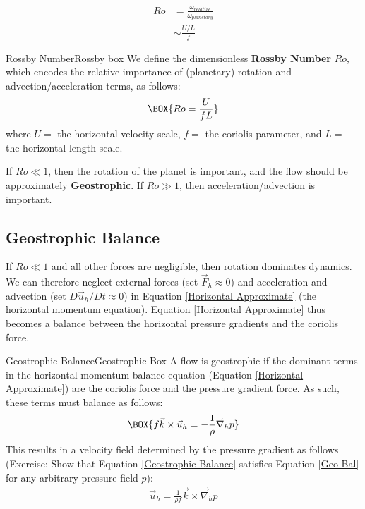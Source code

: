 \begin{align}
    Ro &= \frac{\omega_{relative}}{\omega_{planetary}}\\
    &\sim\frac{U/L}{f}
\end{align}

\begin{fact}{Rossby Number}{Rossby box}\label{Rossby Box}
    We define the dimensionless \textbf{Rossby Number} $Ro$, which encodes the relative importance of (planetary) rotation and advection/acceleration terms, as follows:
    \begin{gather}
        \BOX{
            Ro=\frac{U}{fL}
        }
    \end{gather}
    where $U=$ the horizontal velocity scale, $f=$ the coriolis parameter, and $L=$ the horizontal length scale. 
    
    If $Ro\ll 1$, then the rotation of the planet is important, and the flow should be approximately \textbf{Geostrophic}. If $Ro\gg 1$, then acceleration/advection is important.
\end{fact}

\subsection{Geostrophic Balance}

If $Ro\ll 1$ and all other forces are negligible, then rotation dominates dynamics. We can therefore neglect external forces (set $\vec{F}_h\approx0$) and acceleration and advection (set $D\vec{u}_h/Dt\approx0$) in Equation \ref{Horizontal Approximate} (the horizontal momentum equation). Equation \ref{Horizontal Approximate} thus becomes a balance between the horizontal pressure gradients and the coriolis force. 

\begin{fact}{Geostrophic Balance}{Geostrophic Box}\label{Geostrophic Box}
    A flow is geostrophic if the dominant terms in the horizontal momentum balance equation (Equation \ref{Horizontal Approximate}) are the coriolis force and the pressure gradient force. As such, these terms must balance as follows:
    \begin{align}
        \label{Geo Bal}
        \BOX{f\vec{k}\times\vec{u}_h=-\frac{1}{\rho}\vec{\nabla}_hp}
    \end{align}
    This results in a velocity field determined by the pressure gradient as follows (Exercise: Show that Equation \ref{Geostrophic Balance} satisfies Equation \ref{Geo Bal} for any arbitrary pressure field $p$):
    \begin{align}\label{Geostrophic Balance}
        \boxed{\vec{u}_h=\frac{1}{\rho f}\vec{k}\times\vec{\nabla}_hp}
    \end{align}
\end{fact}

